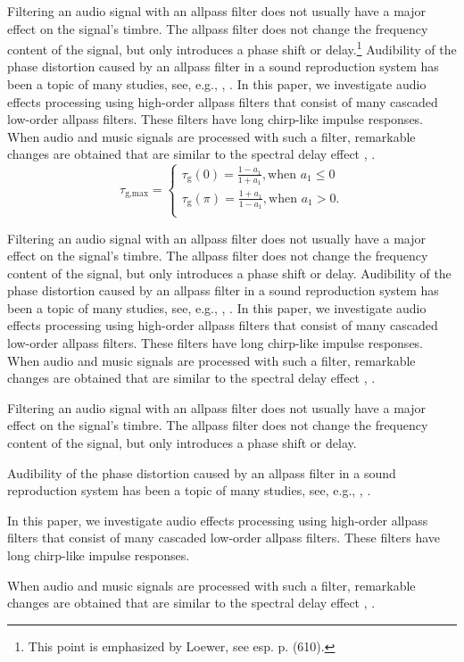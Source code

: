 \documentclass{aes2e}
\begin{document}
Filtering an audio signal with an allpass filter does not usually have a major effect on the signal's timbre. The allpass filter does not change the frequency content of the \nobreak signal, but only introduces a phase shift or delay.\footnote{This point is emphasized by Loewer, see esp. p. (610).} Audibility of the phase distortion caused by an allpass filter in a sound reproduction system has been a topic of many studies, see, e.g., \cite{DEK1}, \cite{DEK2}. In this paper, we investigate audio effects processing using high-order allpass filters that consist of many cascaded low-order allpass filters. These filters have long chirp-like impulse responses. When audio and music signals are processed with such a filter, remarkable changes are obtained that are similar to the spectral delay effect  \cite{DEK3}, \cite{DEK4}.
\begin{equation}
\tau _{\textrm{g,max}}  = \left\{ \begin{array}{l}
 \tau _\textrm{g} (0) = \frac{{1 - a_1 }}{{1 + a_1 }},\textrm{when }a_1  \le 0 \\[4pt]
 \tau _\textrm{g} (\pi ) = \frac{{1 + a_1 }}{{1 - a_1 }},\textrm{when }a_1  > 0. \\
 \end{array} \right.\end{equation}

Filtering an audio signal with an allpass filter does not usually have a major effect on the signal's timbre. The allpass filter does not change the frequency content of the signal, but only introduces a phase shift or delay. Audibility of the phase distortion caused by an allpass filter in a sound reproduction system has been a topic of many studies, see, e.g., \cite{DEK1}, \cite{DEK2}. In this paper, we investigate audio effects processing using high-order allpass filters that consist of many cascaded low-order allpass filters. These filters have long chirp-like impulse responses. When audio and music signals are processed with such a filter, remarkable changes are obtained that are similar to the spectral delay effect  \cite{DEK3}, \cite{DEK4}.
\begin{paralist}
\item{}Filtering an audio signal with an allpass filter does not usually have a major effect on the signal's timbre. The allpass filter does not change the frequency content of the signal, but only introduces a phase shift or delay. 
\item{}Audibility of the phase distortion caused by an allpass filter in a sound reproduction system has been a topic of many studies, see, e.g., \cite{DEK1}, \cite{DEK2}. 
\item{}In this paper, we investigate audio effects processing using high-order allpass filters that consist of many cascaded low-order allpass filters. These filters have long chirp-like impulse responses. 
\item{}When audio and music signals are processed with such a filter, remarkable changes are obtained that are similar to the spectral delay effect  \cite{DEK3}, \cite{DEK4}.
\end{paralist}
\end{document}
